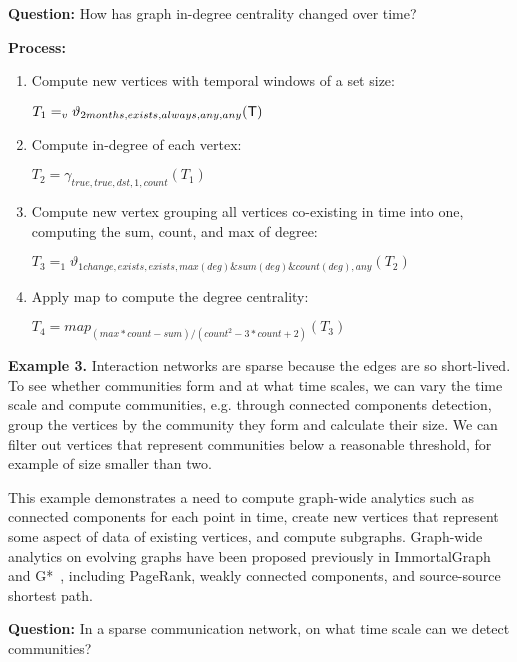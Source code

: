 {\bf Question:} How has graph in-degree centrality changed over time?

{\bf Process:}
\begin{enumerate}[noitemsep]
\item Compute new vertices with temporal windows of a set size:

$T_1 = _v\vartheta_{2 months,exists,always,any,any}( \mathsf{T})$

\item Compute in-degree of each vertex:

$T_2 = \gamma_{true,true,dst,1,count}(T_1)$

\item Compute new vertex grouping all vertices co-existing in time
  into one, computing the sum, count, and max of degree:

$T_3 = _1\vartheta_{1 change,exists,exists,max(deg)\&sum(deg)\&count(deg),any}(T_2)$

\item Apply map to compute the degree centrality:

$T_4 = map_{(max*count-sum)/(count^2-3*count+2)}(T_3)$

\end{enumerate}

{\bf Example 3.}  Interaction networks are sparse because the edges
are so short-lived.  To see whether communities form and at what time
scales, we can vary the time scale and compute communities,
e.g. through connected components detection, group the vertices by the
community they form and calculate their size.  We can filter out
vertices that represent communities below a reasonable threshold, for
example of size smaller than two.

This example demonstrates a need to compute graph-wide analytics such
as connected components for each point in time, create new vertices
that represent some aspect of data of existing vertices, and compute
subgraphs.  Graph-wide analytics on evolving graphs have been proposed
previously in ImmortalGraph~\cite{Miao2015} and
G*~\cite{Labouseur2015}, including PageRank, weakly connected
components, and source-source shortest path.

{\bf Question:} In a sparse communication network, on what time scale can we
detect communities?

